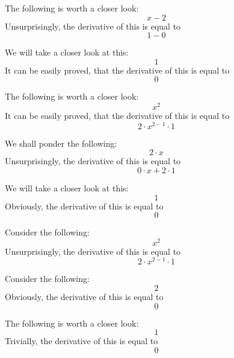 \documentclass{article}
\begin{document}
The following is worth a closer look:
\begin{equation}
x - 2 
\end{equation}
Unsurprisingly, the derivative of this is equal to
\begin{equation}
1 - 0 
\end{equation}

We will take a closer look at this:
\begin{equation}
1 
\end{equation}
It can be easily proved, that the derivative of this is equal to
\begin{equation}
0 
\end{equation}

The following is worth a closer look:
\begin{equation}
x ^{2 } 
\end{equation}
It can be easily proved, that the derivative of this is equal to
\begin{equation}
2 \cdot x ^{2 - 1 } \cdot 1 
\end{equation}

We shall ponder the following:
\begin{equation}
2 \cdot x 
\end{equation}
Unsurprisingly, the derivative of this is equal to
\begin{equation}
0 \cdot x + 2 \cdot 1 
\end{equation}

We will take a closer look at this:
\begin{equation}
1 
\end{equation}
Obviously, the derivative of this is equal to
\begin{equation}
0 
\end{equation}

Consider the following:
\begin{equation}
x ^{2 } 
\end{equation}
Unsurprisingly, the derivative of this is equal to
\begin{equation}
2 \cdot x ^{2 - 1 } \cdot 1 
\end{equation}

Consider the following:
\begin{equation}
2 
\end{equation}
Obviously, the derivative of this is equal to
\begin{equation}
0 
\end{equation}

The following is worth a closer look:
\begin{equation}
1 
\end{equation}
Trivially, the derivative of this is equal to
\begin{equation}
0 
\end{equation}
\end{document}

